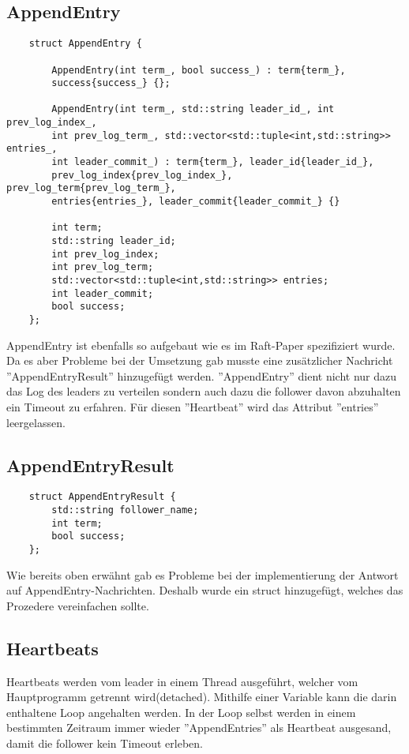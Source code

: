\subsection{AppendEntry}
\begin{verbatim}
    struct AppendEntry {
        
        AppendEntry(int term_, bool success_) : term{term_},
        success{success_} {};

        AppendEntry(int term_, std::string leader_id_, int prev_log_index_,
        int prev_log_term_, std::vector<std::tuple<int,std::string>> entries_,
        int leader_commit_) : term{term_}, leader_id{leader_id_},
        prev_log_index{prev_log_index_}, prev_log_term{prev_log_term_},
        entries{entries_}, leader_commit{leader_commit_} {}
        
        int term;
        std::string leader_id;
        int prev_log_index;
        int prev_log_term;
        std::vector<std::tuple<int,std::string>> entries;
        int leader_commit;
        bool success;
    };
\end{verbatim}
AppendEntry ist ebenfalls so aufgebaut wie es im Raft-Paper spezifiziert wurde. Da es aber Probleme bei der
Umsetzung gab musste eine zusätzlicher Nachricht ''AppendEntryResult'' hinzugefügt werden. ''AppendEntry'' dient nicht
nur dazu das Log des leaders zu verteilen sondern auch dazu die follower davon abzuhalten ein Timeout zu erfahren.
Für diesen ''Heartbeat'' wird das Attribut ''entries'' leergelassen.

\subsection{AppendEntryResult}
\begin{verbatim}
    struct AppendEntryResult {
        std::string follower_name;
        int term;
        bool success;
    };
\end{verbatim}
Wie bereits oben erwähnt gab es Probleme bei der implementierung der Antwort auf AppendEntry-Nachrichten. Deshalb wurde ein
struct hinzugefügt, welches das Prozedere vereinfachen sollte.

\subsection{Heartbeats}
Heartbeats werden vom leader in einem Thread ausgeführt, welcher vom Hauptprogramm getrennt wird(detached). Mithilfe einer
Variable kann die darin enthaltene Loop angehalten werden. In der Loop selbst werden in einem bestimmten Zeitraum immer wieder
''AppendEntries'' als Heartbeat ausgesand, damit die follower kein Timeout erleben.
